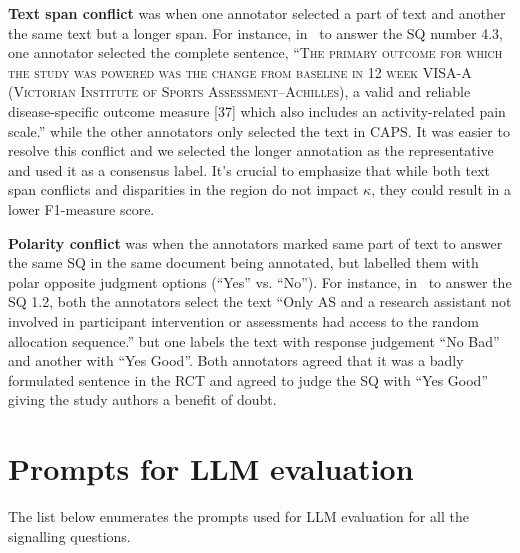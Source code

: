 \documentclass[sn-mathphys,Numbered]{sn-jnl}%
\begin{document}
\textbf{Text span conflict} was when one annotator selected a part of text and another the same text but a longer span.
For instance, in~\cite{solomons2020intramuscular} to answer the SQ number 4.3, one annotator selected the complete sentence, ``\textsc{The primary outcome for which the study was powered was the change from baseline in 12 week VISA-A (Victorian Institute of Sports Assessment–Achilles),} a valid and reliable disease-specific outcome measure [37] which also includes an activity-related pain scale.'' while the other annotators only selected the text in CAPS. 
It was easier to resolve this conflict and we selected the longer annotation as the representative and used it as a consensus label.
It's crucial to emphasize that while both text span conflicts and disparities in the region do not impact $\kappa$, they could result in a lower F1-measure score.


\textbf{Polarity conflict} was when the annotators marked same part of text to answer the same SQ in the same document being annotated, but labelled them with polar opposite judgment options (``Yes'' vs. ``No'').
For instance, in~\cite{solomons2020intramuscular} to answer the SQ 1.2, both the annotators select the text ``Only AS and a research assistant not involved in participant intervention or assessments had access to the random allocation sequence.'' but one labels the text with response judgement ``No Bad'' and another with ``Yes Good''.
Both annotators agreed that it was a badly formulated sentence in the RCT and agreed to judge the SQ with ``Yes Good'' giving the study authors a benefit of doubt. 
%
%
%
\section*{Prompts for LLM evaluation}
\label{sec:llms}
%
The list below enumerates the prompts used for LLM evaluation for all the signalling questions.
\end{document}
